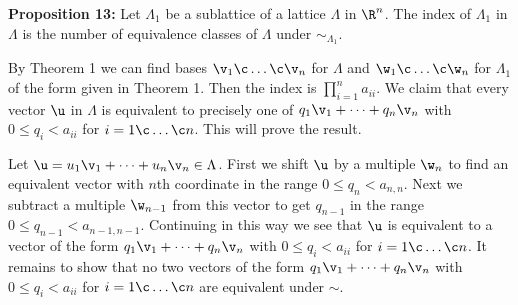 \textbf{Proposition 13:} Let $\Lambda_1$ be a sublattice of a lattice $\Lambda$ in $\R^n$.  The index of $\Lambda_1$ in $\Lambda$ is the number of equivalence classes of $\Lambda$ under $\sim_{\Lambda_1}$.

\pf By Theorem 1 we can find bases $\v_1\c \dotsc\c\v_n$ for $\Lambda$ and $\w_1\c \dotsc\c\w_n$ for $\Lambda_1$ of the form given in Theorem 1.  Then the index is $\prod_{i=1}^n a_{ii}$.  We claim that every vector $\u$ in $\Lambda$ is equivalent to precisely one of $q_1\v_1+\dotsb+q_n\v_n$ with $0\leq q_i<a_{ii}$ for $i=1\c \dotsc\c n$.  This will prove the result.

Let $\u=u_1\v_1+\dotsb+u_n\v_n\in\Lambda$.  First we shift $\u$ by a multiple $\w_n$ to find an equivalent vector with $n$th coordinate in the range $0\leq q_n<a_{n,n}$.  Next we subtract a multiple $\w_{n-1}$ from this vector to get $q_{n-1}$ in the range $0\leq q_{n-1}<a_{n-1,n-1}$.  Continuing in this way we see that $\u$ is equivalent to a vector of the form $q_1\v_1+\dotsb+q_n\v_n$ with $0\leq q_i<a_{ii}$ for $i=1\c \dotsc\c n$.  It remains to show that no two vectors of the form $q_1\v_1+\dotsb+q_n\v_n$ with $0\leq q_i<a_{ii}$ for $i=1\c \dotsc\c n$ are equivalent under $\sim$.
